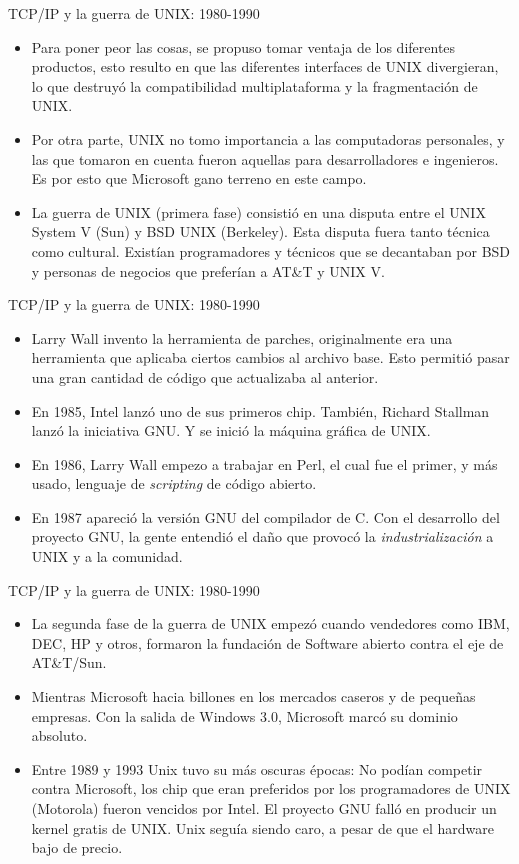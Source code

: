 \documentclass[11pt]{beamer}
\begin{document}
		\begin{frame}{TCP/IP y la guerra de UNIX: 1980-1990}
			\begin{itemize}
				\item Para poner peor las cosas, se propuso tomar ventaja de los diferentes productos, esto resulto en que las diferentes interfaces de UNIX divergieran, lo que destruyó la compatibilidad multiplataforma y la fragmentación de UNIX.
				\item Por otra parte, UNIX no tomo importancia a las computadoras personales, y las que tomaron en cuenta fueron aquellas para desarrolladores e ingenieros. Es por esto que Microsoft gano terreno en este campo.
				\item La guerra de UNIX (primera fase) consistió en una disputa entre el UNIX System V (Sun) y BSD UNIX (Berkeley). Esta disputa fuera tanto técnica como cultural. Existían programadores y técnicos que se decantaban por BSD y personas de negocios que preferían a AT\&T y UNIX V.
			\end{itemize}
		\end{frame}
		\begin{frame}{TCP/IP y la guerra de UNIX: 1980-1990}
			\begin{itemize}
				\item Larry Wall invento la herramienta de parches, originalmente era una herramienta que aplicaba ciertos cambios al archivo base. Esto permitió pasar una gran cantidad de código que actualizaba al anterior.
				\item En 1985, Intel lanzó uno de sus primeros chip. También, Richard Stallman lanzó la iniciativa GNU. Y se inició la máquina gráfica de UNIX.
				\item En 1986, Larry Wall empezo a trabajar en Perl, el cual fue el primer, y más usado, lenguaje de \textit{scripting} de código abierto.
				\item En 1987 apareció la versión GNU del compilador de C. Con el desarrollo del proyecto GNU, la gente entendió el daño que provocó la \textit{industrialización} a UNIX y a la comunidad.
			\end{itemize}
		\end{frame}
		\begin{frame}{TCP/IP y la guerra de UNIX: 1980-1990}
			\begin{itemize}
				\item La segunda fase de la guerra de UNIX empezó cuando vendedores como IBM, DEC, HP y otros, formaron la fundación de Software abierto contra el eje de AT\&T/Sun.
				\item Mientras Microsoft hacia billones en los mercados caseros y de pequeñas empresas. Con la salida de Windows 3.0, Microsoft marcó su dominio absoluto.
				\item Entre 1989 y 1993 Unix tuvo su más oscuras épocas: No podían competir contra Microsoft, los chip que eran preferidos por los programadores de UNIX (Motorola) fueron vencidos por Intel. El proyecto GNU falló en producir un kernel gratis de UNIX. Unix seguía siendo caro, a pesar de que el hardware bajo de precio.
			\end{itemize}
		\end{frame}
\end{document}
